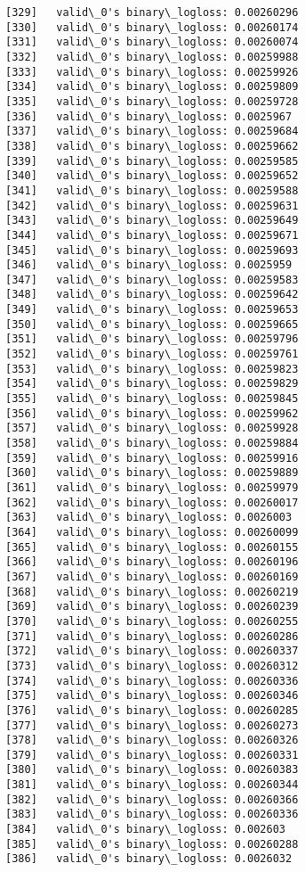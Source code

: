 \documentclass[11pt]{article}
\begin{document}
\begin{Verbatim}[commandchars=\\\{\}]
[329]	valid\_0's binary\_logloss: 0.00260296
[330]	valid\_0's binary\_logloss: 0.00260174
[331]	valid\_0's binary\_logloss: 0.00260074
[332]	valid\_0's binary\_logloss: 0.00259988
[333]	valid\_0's binary\_logloss: 0.00259926
[334]	valid\_0's binary\_logloss: 0.00259809
[335]	valid\_0's binary\_logloss: 0.00259728
[336]	valid\_0's binary\_logloss: 0.0025967
[337]	valid\_0's binary\_logloss: 0.00259684
[338]	valid\_0's binary\_logloss: 0.00259662
[339]	valid\_0's binary\_logloss: 0.00259585
[340]	valid\_0's binary\_logloss: 0.00259652
[341]	valid\_0's binary\_logloss: 0.00259588
[342]	valid\_0's binary\_logloss: 0.00259631
[343]	valid\_0's binary\_logloss: 0.00259649
[344]	valid\_0's binary\_logloss: 0.00259671
[345]	valid\_0's binary\_logloss: 0.00259693
[346]	valid\_0's binary\_logloss: 0.0025959
[347]	valid\_0's binary\_logloss: 0.00259583
[348]	valid\_0's binary\_logloss: 0.00259642
[349]	valid\_0's binary\_logloss: 0.00259653
[350]	valid\_0's binary\_logloss: 0.00259665
[351]	valid\_0's binary\_logloss: 0.00259796
[352]	valid\_0's binary\_logloss: 0.00259761
[353]	valid\_0's binary\_logloss: 0.00259823
[354]	valid\_0's binary\_logloss: 0.00259829
[355]	valid\_0's binary\_logloss: 0.00259845
[356]	valid\_0's binary\_logloss: 0.00259962
[357]	valid\_0's binary\_logloss: 0.00259928
[358]	valid\_0's binary\_logloss: 0.00259884
[359]	valid\_0's binary\_logloss: 0.00259916
[360]	valid\_0's binary\_logloss: 0.00259889
[361]	valid\_0's binary\_logloss: 0.00259979
[362]	valid\_0's binary\_logloss: 0.00260017
[363]	valid\_0's binary\_logloss: 0.0026003
[364]	valid\_0's binary\_logloss: 0.00260099
[365]	valid\_0's binary\_logloss: 0.00260155
[366]	valid\_0's binary\_logloss: 0.00260196
[367]	valid\_0's binary\_logloss: 0.00260169
[368]	valid\_0's binary\_logloss: 0.00260219
[369]	valid\_0's binary\_logloss: 0.00260239
[370]	valid\_0's binary\_logloss: 0.00260255
[371]	valid\_0's binary\_logloss: 0.00260286
[372]	valid\_0's binary\_logloss: 0.00260337
[373]	valid\_0's binary\_logloss: 0.00260312
[374]	valid\_0's binary\_logloss: 0.00260336
[375]	valid\_0's binary\_logloss: 0.00260346
[376]	valid\_0's binary\_logloss: 0.00260285
[377]	valid\_0's binary\_logloss: 0.00260273
[378]	valid\_0's binary\_logloss: 0.00260326
[379]	valid\_0's binary\_logloss: 0.00260331
[380]	valid\_0's binary\_logloss: 0.00260383
[381]	valid\_0's binary\_logloss: 0.00260344
[382]	valid\_0's binary\_logloss: 0.00260366
[383]	valid\_0's binary\_logloss: 0.00260336
[384]	valid\_0's binary\_logloss: 0.002603
[385]	valid\_0's binary\_logloss: 0.00260288
[386]	valid\_0's binary\_logloss: 0.0026032

\end{Verbatim}
\end{document}
